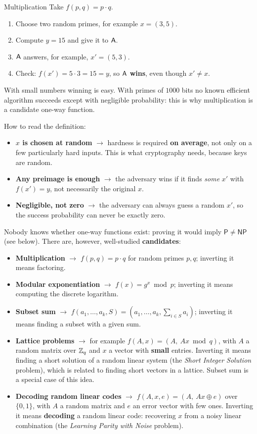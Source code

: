 \begin{framedex}{Multiplication}
  Take $f(p, q) = p \cdot q$.
  \begin{enumerate}
    \item Choose two random primes, for example $x = (3, 5)$.
    \item Compute $y = 15$ and give it to $\mathsf{A}$.
    \item $\mathsf{A}$ answers, for example, $x' = (5, 3)$.
    \item Check: $f(x') = 5 \cdot 3 = 15 = y$, so \textbf{$\mathsf{A}$ wins}, even though $x' \neq x$.
  \end{enumerate}
  With small numbers winning is easy. With primes of $1000$ bits no known efficient algorithm succeeds except with negligible probability: this is why multiplication is a candidate one-way function.
\end{framedex}

How to read the definition:
\begin{itemize}
  \item \textbf{$x$ is chosen at random} $\to$ hardness is required \textbf{on average}, not only on a few particularly hard inputs. This is what cryptography needs, because keys are random.
  \item \textbf{Any preimage is enough} $\to$ the adversary wins if it finds \textit{some} $x'$ with $f(x') = y$, not necessarily the original $x$.
  \item \textbf{Negligible, not zero} $\to$ the adversary can always guess a random $x'$, so the success probability can never be exactly zero.
\end{itemize}

Nobody knows whether one-way functions exist: proving it would imply $\mathsf{P} \neq \mathsf{NP}$ (see below). There are, however, well-studied \textbf{candidates}:
\begin{itemize}
  \item \textbf{Multiplication} $\to$ $f(p, q) = p \cdot q$ for random primes $p, q$; inverting it means factoring.
  \item \textbf{Modular exponentiation} $\to$ $f(x) = g^x \bmod p$; inverting it means computing the discrete logarithm.
  \item \textbf{Subset sum} $\to$ $f(a_1, \ldots, a_k, S) = (a_1, \ldots, a_k, \sum_{i \in S} a_i)$; inverting it means finding a subset with a given sum.
  \item \textbf{Lattice problems} $\to$ for example $f(A, x) = (A,\ A x \bmod q)$, with $A$ a random matrix over $\mathbb{Z}_q$ and $x$ a vector with \textbf{small} entries. Inverting it means finding a short solution of a random linear system (the \textit{Short Integer Solution} problem), which is related to finding short vectors in a lattice. Subset sum is a special case of this idea.
  \item \textbf{Decoding random linear codes} $\to$ $f(A, x, e) = (A,\ A x \oplus e)$ over $\{0,1\}$, with $A$ a random matrix and $e$ an error vector with few ones. Inverting it means \textbf{decoding} a random linear code: recovering $x$ from a noisy linear combination (the \textit{Learning Parity with Noise} problem).
\end{itemize}

